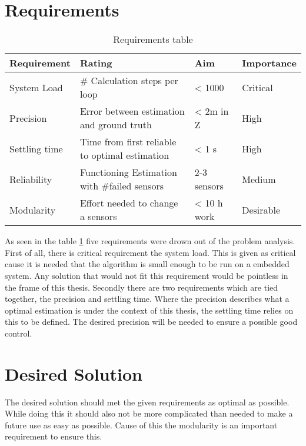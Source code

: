  \section{Requirements}
 
 \begin{table}[h]
 \centering
 \begin{tabular}{|l|l|l|l|}	
 \hline	
 \bf{Requirement}   & \bf{Rating} & \bf{Aim} & \bf{Importance} \\ \hline
 System Load   & \# Calculation steps per loop & < 1000 & Critical \\ \hline
 Precision     & Error between estimation and ground truth  & < 2m in Z & High  \\ \hline
 Settling time & Time from first reliable to optimal estimation  & < 1 s &  High \\ \hline
 Reliability   & Functioning Estimation with \#failed sensors & 2-3 sensors & Medium \\ \hline	
 Modularity    & Effort needed to change a sensors & < 10 h work &  Desirable \\ \hline
 \end{tabular}	
 \caption{Requirements table}
 \label{tab:Requirements}
 \end{table}
 
 As seen in the table \ref{tab:Requirements} five requirements were drown out of the problem analysis. 
 First of all, there is critical requirement the system load. This is given as critical cause it is needed that the algorithm is small enough to be run on a embedded system.
 Any solution that would not fit this requirement would be pointless in the frame of this thesis.
 Secondly there are two requirements which are tied together, the precision and settling time.
 Where the precision describes what a optimal estimation is under the context of this thesis, the settling time relies on this to be defined.
 The desired precision will be needed to ensure a possible good control.
 \section{Desired Solution}
 The desired solution should met the given requirements as optimal as possible. While doing this it should also not be more complicated than needed
 to make a future use as easy as possible. Cause of this the modularity is an important requirement to ensure this.
